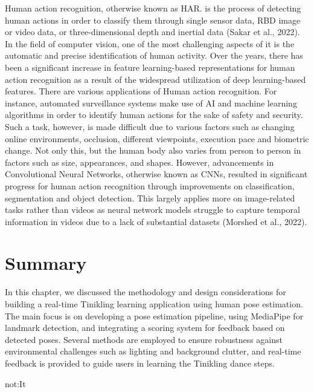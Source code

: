 	Human action recognition, otherwise known as HAR. is the process of detecting human actions in order to classify them through single sensor data, RBD image or video data, or three-dimensional depth and inertial data (Sakar et al., 2022). In the field of computer vision, one of the most challenging aspects of it is the automatic and precise identification of human activity. Over the years, there has been a significant increase in feature learning-based representations for human action recognition as a result of the widespread utilization of deep learning-based features. There are various applications of Human action recognition. For instance, automated surveillance systems make use of AI and machine learning algorithms in order to identify human actions for the sake of safety and security. Such a task, however, is made difficult due to various factors such as changing online environments, occlusion, different viewpoints, execution pace and biometric change. Not only this, but the human body also varies from person to person in factors such as size, appearances, and shapes. However, advancements in Convolutional Neural Networks, otherwise known as CNNs, resulted in significant progress for human action recognition through improvements on classification, segmentation and object detection. This largely applies more on image-related tasks  rather than videos as neural network models struggle to capture temporal information in videos due to a lack of substantial datasets (Morshed et al., 2022). 


\section{Summary}
In this chapter, we discussed the methodology and design considerations for building a real-time Tinikling learning application using human pose estimation. The main focus is on developing a pose estimation pipeline, using MediaPipe for landmark detection, and integrating a scoring system for feedback based on detected poses. Several methods are employed to ensure robustness against environmental challenges such as lighting and background clutter, and real-time feedback is provided to guide users in learning the Tinikling dance steps.

\gls{not:It}